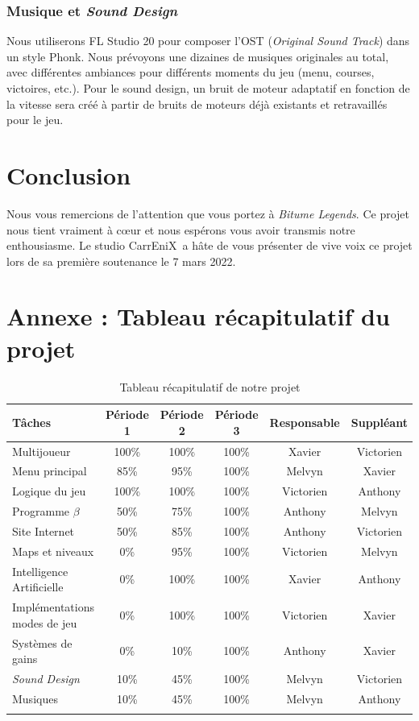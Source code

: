 \documentclass[12pt,a4paper]{article}
\newcommand{\btmlgs}{\textit{Bitume Legends}}
\newcommand{\AI}{Intelligence Artificielle}
\newcommand{\CEX}{CarrEniX}
\begin{document}
\subsubsection{Musique et \textit{Sound Design}}
Nous utiliserons FL Studio 20 pour composer l'OST (\textit{Original Sound Track}) dans un style Phonk.
Nous prévoyons une dizaines de musiques originales au total, avec différentes ambiances pour
différents moments du jeu (menu, courses, victoires, etc.). Pour le sound design, un bruit de 
moteur adaptatif en fonction de la vitesse sera créé à partir de bruits de moteurs déjà 
existants et retravaillés pour le jeu.
\clearpage

\section{Conclusion}
Nous vous remercions de l'attention que vous portez à \btmlgs.
Ce projet nous tient vraiment à cœur et nous espérons vous avoir transmis notre enthousiasme.
Le studio \CEX\, a hâte de vous présenter de vive voix ce projet lors de sa première soutenance le 7 mars 2022.


\section{Annexe : Tableau récapitulatif du projet}
\renewcommand{\arraystretch}{1.2}
\setlength{\LTleft}{-1cm plus 1 fill}
\setlength{\LTright}{-1cm plus 1 fill}
\begin{longtable}{| p{4.5cm} || c | c | c | c | c |}
    \hline
    Tâches & Période 1 & Période 2 & Période 3 & Responsable & Suppléant\\\hline\hline
    Multijoueur & 100\% & 100\% & 100\% & Xavier & Victorien \\\hline
    Menu principal & 85\% & 95\% & 100\% & Melvyn & Xavier \\\hline
    Logique du jeu & 100\% & 100\%  & 100\% & Victorien & Anthony\\\hline
    Programme \(\beta\) & 50\% & 75\% & 100\% & Anthony & Melvyn \\\hline
    Site Internet & 50\% & 85\%  & 100\% & Anthony & Victorien\\\hline
    Maps et niveaux & 0\% & 95\%  & 100\% & Victorien & Melvyn\\\hline
    \AI & 0\% & 100\%  & 100\% & Xavier & Anthony\\\hline
    Implémentations modes de jeu & 0\% & 100\%  & 100\% & Victorien & Xavier\\\hline
    Systèmes de gains & 0\% & 10\%  & 100\% & Anthony & Xavier\\\hline
    \textit{Sound Design} & 10\% & 45\% & 100\% & Melvyn & Victorien\\\hline
    Musiques & 10\% & 45\%  & 100\% & Melvyn & Anthony \\\hline
    \caption{Tableau récapitulatif de notre projet}
\end{longtable}
\end{document}
